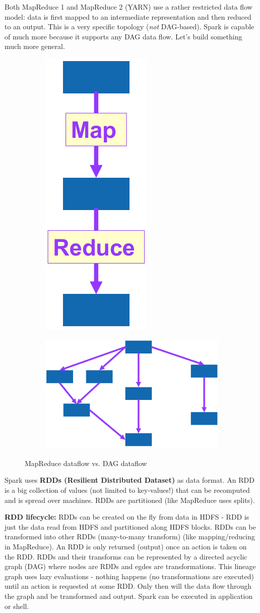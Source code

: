 \documentclass[11pt,oneside,a4paper]{article}
\begin{document}
Both MapReduce 1 and MapReduce 2 (YARN) use a rather restricted data flow model: data is first mapped to an intermediate representation and then reduced to an output. This is a very specific topology (\textit{not} DAG-based). Spark is capable of much more because it supports any DAG data flow. Let's build something much more general.

\begin{figure}[hb!]
	\centering
	\begin{subfigure}[t]{.5\textwidth}
		\centering
		\includegraphics[width=0.1\linewidth]{figures/spark_mr_intuition}
		\label{fig:sparkmrintuition}
	\end{subfigure}%
	\begin{subfigure}[t]{.5\textwidth}
		\centering
		\includegraphics[width=0.4\linewidth]{figures/spark_dag_dataflow}
		\label{fig:sparkdag}
	\end{subfigure}
	\caption{MapReduce dataflow vs. DAG dataflow}
\end{figure}

Spark uses \textbf{RDDs (Resilient Distributed Dataset)} as data format. An RDD is a big collection of values (not limited to key-values!) that can be recomputed and is spread over machines. RDDs are partitioned (like MapReduce uses splits).

\textbf{RDD lifecycle:} RDDs can be created on the fly from data in HDFS - RDD is just the data read from HDFS and partitioned along HDFS blocks. RDDs can be transformed into other RDDs (many-to-many transform) (like mapping/reducing in MapReduce). An RDD is only returned (output) once an action is taken on the RDD. RDDs and their transforms can be represented by a directed acyclic graph (DAG) where nodes are RDDs and egdes are transformations. This lineage graph uses lazy evaluations - nothing happens (no transformations are executed) until an action is requested at some RDD. Only then will the data flow through the graph and be transformed and output. Spark can be executed in application or shell.
\end{document}
